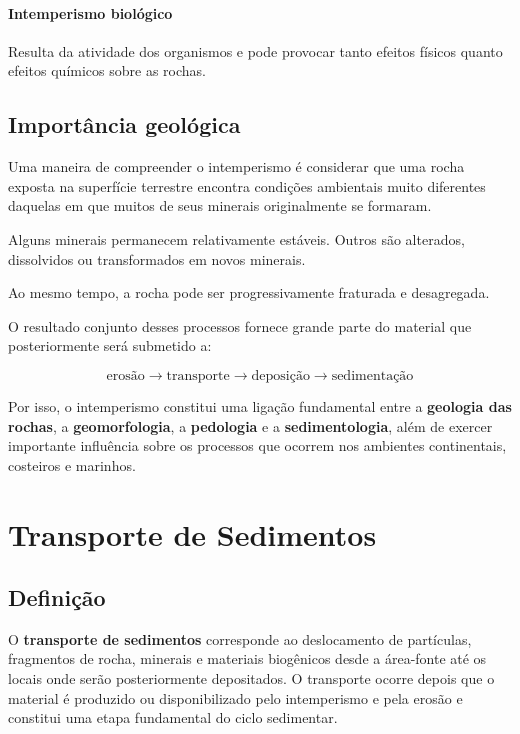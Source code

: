 \documentclass[a4paper,12pt]{article}
\theoremstyle{definition}
\theoremstyle{definition}
\theoremstyle{definition}
\begin{document}
\paragraph{Intemperismo biológico}

Resulta da atividade dos organismos e pode provocar tanto efeitos físicos quanto efeitos químicos sobre as rochas.

\subsection{Importância geológica}

Uma maneira de compreender o intemperismo é considerar que uma rocha exposta na superfície terrestre encontra condições ambientais muito diferentes daquelas em que muitos de seus minerais originalmente se formaram.

Alguns minerais permanecem relativamente estáveis. Outros são alterados, dissolvidos ou transformados em novos minerais.

Ao mesmo tempo, a rocha pode ser progressivamente fraturada e desagregada.

O resultado conjunto desses processos fornece grande parte do material que posteriormente será submetido a:

\[
\boxed{
\text{erosão}
\rightarrow
\text{transporte}
\rightarrow
\text{deposição}
\rightarrow
\text{sedimentação}
}
\]

Por isso, o intemperismo constitui uma ligação fundamental entre a \textbf{geologia das rochas}, a \textbf{geomorfologia}, a \textbf{pedologia} e a \textbf{sedimentologia}, além de exercer importante influência sobre os processos que ocorrem nos ambientes continentais, costeiros e marinhos.



\section{Transporte de Sedimentos}

\subsection{Definição}

O \textbf{transporte de sedimentos} corresponde ao deslocamento de partículas,
fragmentos de rocha, minerais e materiais biogênicos desde a área-fonte até os
locais onde serão posteriormente depositados. O transporte ocorre depois que o
material é produzido ou disponibilizado pelo intemperismo e pela erosão e
constitui uma etapa fundamental do ciclo sedimentar.
\end{document}
